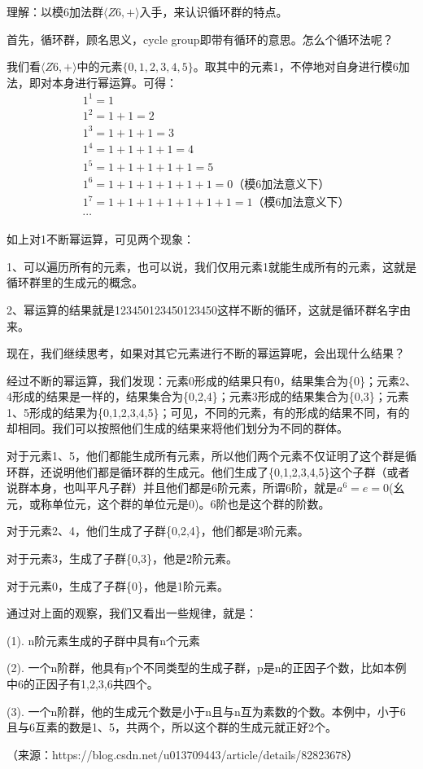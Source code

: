 \documentclass[12pt]{article}
\begin{document}
\begin{framed}
\small {
理解：以模6加法群$\langle Z6, +\rangle$入手，来认识循环群的特点。

首先，循环群，顾名思义，cycle group即带有循环的意思。怎么个循环法呢？

我们看$\langle Z6, +\rangle$中的元素$\{0,1,2,3,4,5\}$。取其中的元素1，不停地对自身进行模6加法，即对本身进行幂运算。可得：
\begin{align*}
& 1^1=1 \\
& 1^2=1+1=2 \\
& 1^3=1+1+1=3 \\
& 1^4=1+1+1+1=4 \\
& 1^5=1+1+1+1+1=5 \\
& 1^6=1+1+1+1+1+1=0 \text{（模6加法意义下）}\\
& 1^7=1+1+1+1+1+1+1=1\text{（模6加法意义下）} \\
& \cdots
\end{align*}

如上对1不断幂运算，可见两个现象：

1、可以遍历所有的元素，也可以说，我们仅用元素1就能生成所有的元素，这就是循环群里的生成元的概念。

2、幂运算的结果就是123450123450123450这样不断的循环，这就是循环群名字由来。

现在，我们继续思考，如果对其它元素进行不断的幂运算呢，会出现什么结果？

经过不断的幂运算，我们发现：元素0形成的结果只有0，结果集合为\{0\}；元素2、4形成的结果是一样的，结果集合为\{0,2,4\}；元素3形成的结果集合为\{0,3\}；元素1、5形成的结果为\{0,1,2,3,4,5\}；可见，不同的元素，有的形成的结果不同，有的却相同。我们可以按照他们生成的结果来将他们划分为不同的群体。

对于元素1、5，他们都能生成所有元素，所以他们两个元素不仅证明了这个群是循环群，还说明他们都是循环群的生成元。他们生成了\{0,1,2,3,4,5\}这个子群（或者说群本身，也叫平凡子群）并且他们都是6阶元素，所谓6阶，就是$a^6=e=0$(幺元，或称单位元，这个群的单位元是0)。6阶也是这个群的阶数。

对于元素2、4，他们生成了子群\{0,2,4\}，他们都是3阶元素。

对于元素3，生成了子群\{0,3\}，他是2阶元素。

对于元素0，生成了子群\{0\}，他是1阶元素。

通过对上面的观察，我们又看出一些规律，就是：

(1). n阶元素生成的子群中具有n个元素

(2). 一个n阶群，他具有p个不同类型的生成子群，p是n的正因子个数，比如本例中6的正因子有1,2,3,6共四个。

(3). 一个n阶群，他的生成元个数是小于n且与n互为素数的个数。本例中，小于6且与6互素的数是1、5，共两个，所以这个群的生成元就正好2个。

（来源：https://blog.csdn.net/u013709443/article/details/82823678）
}
\end{framed}
\end{document}
